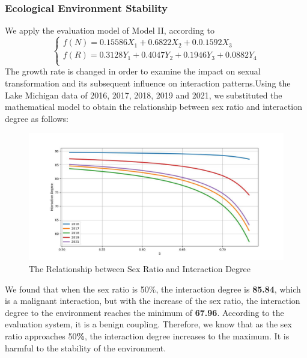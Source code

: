 \documentclass[12pt]{article}  %
\begin{document}
\subsubsection{Ecological Environment Stability}

We apply the evaluation model of Model II, according to
\begin{equation}
	\begin{cases}
		f\left( N \right) =0.15586X_1+0.6822X_2+0.0.1592X_3\\
		f\left( R \right) =0.3128Y_1+0.4047Y_2+0.1946Y_3+0.0882Y_{4}\\
	\end{cases}
\end{equation}
The growth rate is changed in order to examine the impact on sexual transformation and its subsequent influence on interaction patterns.Using the Lake Michigan data of 2016, 2017, 2018, 2019 and 2021, we substituted the mathematical model to obtain the relationship between sex ratio and interaction degree as follows:
\vspace{-0.5cm}
\begin{figure}[H] %
	\centering  %
	\includegraphics[width=.6\textwidth]{5 (1).jpg} %
	\caption{The Relationship between Sex Ratio and Interaction Degree}
\end{figure}
\vspace{-0.8cm}
We found that when the sex ratio is 50$\%$, the interaction degree is \textbf{85.84}, which is a malignant interaction, but with the increase of the sex ratio, the interaction degree to the environment reaches the minimum of \textbf{67.96}. According to the evaluation system, it is a benign coupling. Therefore, we know that as the sex ratio approaches 50\textbf{\%}, the interaction degree increases to the maximum. It is harmful to the stability of the environment.
\end{document}
